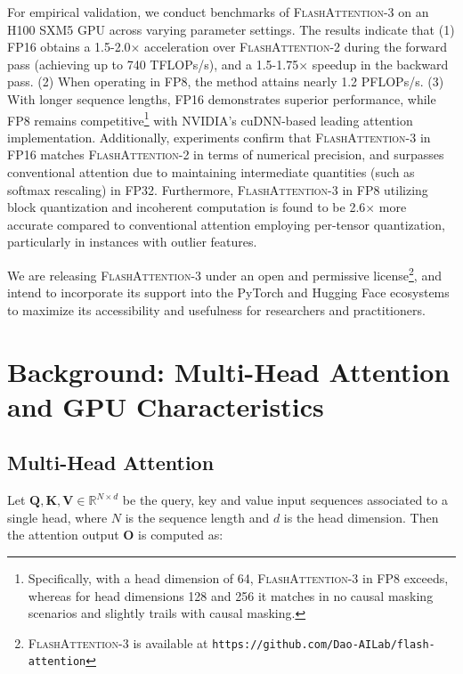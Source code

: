 For empirical validation, we conduct benchmarks of \textsc{FlashAttention-3} on an H100 SXM5 GPU across varying parameter settings. The results indicate that (1) FP16 obtains a 1.5-2.0$\times$ acceleration over \textsc{FlashAttention-2} during the forward pass (achieving up to 740 TFLOPs/s), and a 1.5-1.75$\times$ speedup in the backward pass. (2) When operating in FP8, the method attains nearly 1.2 PFLOPs/s. (3) With longer sequence lengths, FP16 demonstrates superior performance, while FP8 remains competitive\footnote{Specifically, with a head dimension of 64, \textsc{FlashAttention-3} in FP8 exceeds, whereas for head dimensions 128 and 256 it matches in no causal masking scenarios and slightly trails with causal masking.} with NVIDIA's cuDNN-based leading attention implementation. Additionally, experiments confirm that \textsc{FlashAttention-3} in FP16 matches \textsc{FlashAttention-2} in terms of numerical precision, and surpasses conventional attention due to maintaining intermediate quantities (such as softmax rescaling) in FP32. Furthermore, \textsc{FlashAttention-3} in FP8 utilizing block quantization and incoherent computation is found to be 2.6$\times$ more accurate compared to conventional attention employing per-tensor quantization, particularly in instances with outlier features.

We are releasing \textsc{FlashAttention-3} under an open and permissive license\footnote{\textsc{FlashAttention-3}
  is available at \texttt{https://github.com/Dao-AILab/flash-attention}}, and intend to incorporate its support into the PyTorch and Hugging Face ecosystems to maximize its accessibility and usefulness for researchers and practitioners.

\section{Background: Multi-Head Attention and GPU Characteristics}
\label{sec:background}

\subsection{Multi-Head Attention}
\label{subsec:multi_head_attn}

Let $\mathbf{Q}, \mathbf{K}, \mathbf{V} \in \mathbb{R}^{N \times d}$ be the query, key and value input sequences associated to a single head, where $N$ is the sequence length and $d$ is the head dimension. Then the attention output $\mathbf{O}$ is computed as:

